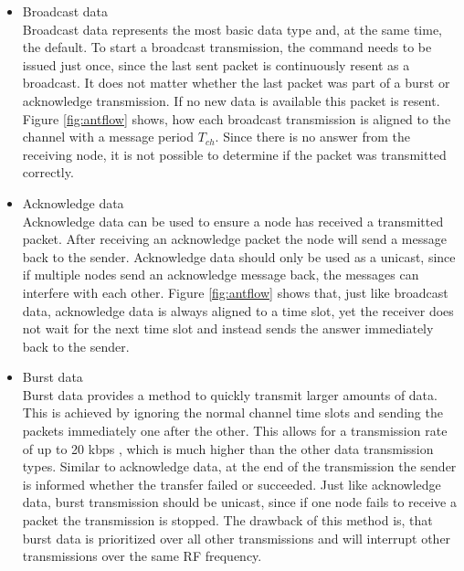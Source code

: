 \begin{itemize}
	\item{Broadcast data} \hfill \\ Broadcast data represents the most basic data type and, at the same time, the default. To start a broadcast transmission, the command needs to be issued just once, since the last sent packet is continuously resent as a broadcast. It does not matter whether the last packet was part of a burst or acknowledge transmission. If no new data is available this packet is resent. Figure \ref{fig:antflow} shows, how each broadcast transmission is aligned to the channel with a message period $T_{ch}$. Since there is no answer from the receiving node, it is not possible to determine if the packet was transmitted correctly.
	
	\item{Acknowledge data} \hfill \\ Acknowledge data can be used to ensure a node has received a transmitted packet. After receiving an acknowledge packet the node will send a message back to the sender. Acknowledge data should only be used as a unicast, since if multiple nodes send an acknowledge message back, the messages can interfere with each other. Figure \ref{fig:antflow} shows that, just like broadcast data, acknowledge data is always aligned to a time slot, yet the receiver does not wait for the next time slot and instead sends the answer immediately back to the sender.
	
	\item{Burst data} \hfill \\ Burst data provides a method to quickly transmit larger amounts of data. This is achieved by ignoring the normal channel time slots and sending the packets immediately one after the other. This allows for a transmission rate of up to 20 kbps \cite{DynastreamInnovationsInc.2013}, which is much higher than the other data transmission types. Similar to acknowledge data, at the end of the transmission the sender is informed whether the transfer failed or succeeded. Just like acknowledge data, burst transmission should be unicast, since if one node fails to receive a packet the transmission is stopped. The drawback of this method is, that burst data is prioritized over all other transmissions and will interrupt other transmissions over the same RF frequency.
\end{itemize}

